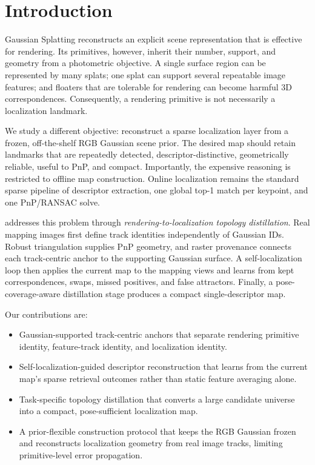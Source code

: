 \section{Introduction}

Gaussian Splatting reconstructs an explicit scene representation that is
effective for rendering. Its primitives, however, inherit their number,
support, and geometry from a photometric objective. A single surface region can
be represented by many splats; one splat can support several repeatable image
features; and floaters that are tolerable for rendering can become harmful 3D
correspondences. Consequently, a rendering primitive is not necessarily a
localization landmark.

We study a different objective: reconstruct a sparse localization layer from
a frozen, off-the-shelf RGB Gaussian scene prior. The desired map should retain
landmarks that are repeatedly detected, descriptor-distinctive, geometrically
reliable, useful to PnP, and compact. Importantly, the expensive reasoning is
restricted to offline map construction. Online localization remains the
standard sparse pipeline of descriptor extraction, one global top-1 match per
keypoint, and one PnP/RANSAC solve.

\method addresses this problem through \emph{rendering-to-localization topology
distillation}. Real mapping images first define track identities independently
of Gaussian IDs. Robust triangulation supplies PnP geometry, and raster
provenance connects each track-centric anchor to the supporting Gaussian
surface. A self-localization loop then applies the current map to the mapping
views and learns from kept correspondences, swaps, missed positives, and false
attractors. Finally, a pose-coverage-aware distillation stage produces a compact
single-descriptor map.

Our contributions are:
\begin{itemize}
  \item Gaussian-supported track-centric anchors that separate rendering
        primitive identity, feature-track identity, and localization identity.
  \item Self-localization-guided descriptor reconstruction that learns from the
        current map's sparse retrieval outcomes rather than static feature
        averaging alone.
  \item Task-specific topology distillation that converts a large candidate
        universe into a compact, pose-sufficient localization map.
  \item A prior-flexible construction protocol that keeps the RGB Gaussian
        frozen and reconstructs localization geometry from real image tracks,
        limiting primitive-level error propagation.
\end{itemize}

